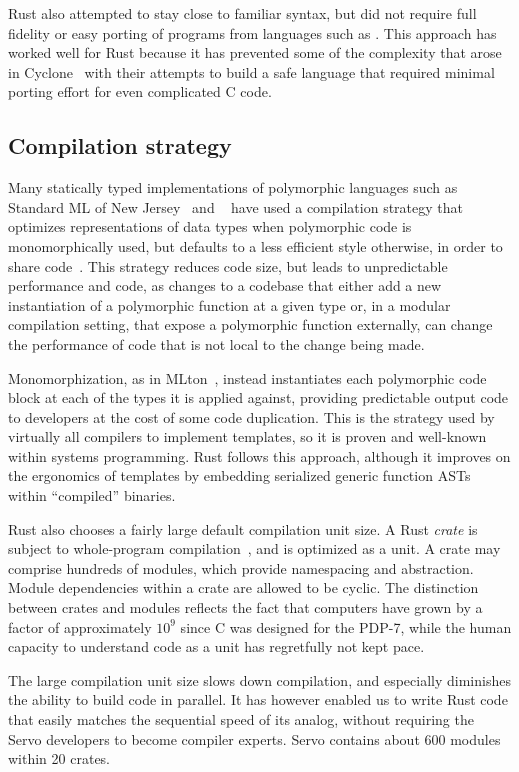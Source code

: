 Rust also attempted to stay close to familiar syntax, but did not require full fidelity or easy porting of
programs from languages such as \Cplusplus{}.
This approach has worked well for Rust because it has prevented some of the complexity that arose in
Cyclone~\cite{cyclone} with their attempts to build a safe language that required minimal porting effort
for even complicated C code.

\subsection{Compilation strategy}
Many statically typed implementations of polymorphic languages such as Standard ML of New Jersey~\cite{SMLNJ} and
\ocaml{}~\cite{ocaml-manual-3.0} have used a compilation strategy that optimizes representations of data types when
polymorphic code is monomorphically used, but defaults to a less efficient style otherwise, in order to share
code~\cite{ocaml-repr}.
This strategy reduces code size, but leads to unpredictable performance and code, as changes to a codebase that
either add a new instantiation of a polymorphic function at a given type or, in a modular compilation setting, that
expose a polymorphic function externally, can change the performance of code that is not local to the change being
made.

Monomorphization, as in MLton~\cite{mlton-compiler}, instead instantiates each polymorphic code block at each of the types
it is applied against, providing predictable output code to developers at the cost of some code duplication.
This is the strategy used by virtually all \Cplusplus{} compilers to implement templates, so it is proven and well-known
within systems programming. Rust follows this approach, although it improves on the ergonomics of \Cplusplus{} templates
by embedding serialized generic function ASTs within ``compiled'' binaries.

Rust also chooses a fairly large default compilation unit size. A Rust \textit{crate} is subject to whole-program
compilation~\cite{weeks:whole-program-mlton}, and is optimized as a unit. A crate may comprise hundreds of modules,
which provide namespacing and abstraction. Module dependencies within a crate are allowed to be cyclic.  The distinction
between crates and modules reflects the fact that computers have grown by a factor of approximately $10^9$ since C was
designed for the PDP-7, while the human capacity to understand code as a unit has regretfully not kept pace.

The large compilation unit size slows down compilation, and especially diminishes the ability to build code in parallel. It has however enabled us to write Rust code that easily matches the sequential speed of its \Cplusplus{} analog, without requiring the Servo developers to become compiler experts. Servo contains about 600 modules within 20 crates.

